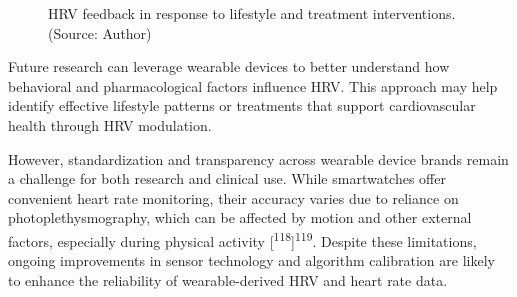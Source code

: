 \documentclass[
  a4paper,
  headsepline=true,
  open=any]{scrbook}
\begin{document}
\begin{figure}

\begin{minipage}[t]{\linewidth}

{\centering 


\caption{HRV feedback in response to lifestyle and treatment
interventions. (Source: Author)}

}

\end{minipage}%

\end{figure}

Future research can leverage wearable devices to better understand how
behavioral and pharmacological factors influence HRV. This approach may
help identify effective lifestyle patterns or treatments that support
cardiovascular health through HRV modulation.

However, standardization and transparency across wearable device brands
remain a challenge for both research and clinical use. While
smartwatches offer convenient heart rate monitoring, their accuracy
varies due to reliance on photoplethysmography, which can be affected by
motion and other external factors, especially during physical activity
{[}\textsuperscript{118}{]}\textsuperscript{119}. Despite these
limitations, ongoing improvements in sensor technology and algorithm
calibration are likely to enhance the reliability of wearable-derived
HRV and heart rate data.
\end{document}
